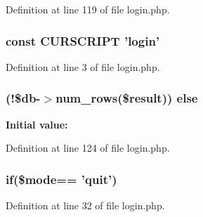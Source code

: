Definition at line 119 of file login.\+php.

\hypertarget{login_8php_a39c39f525eceb86cabc338804f230e80}{
\subsubsection[{C\+U\+R\+S\+C\+R\+I\+P\+T}]{\setlength{\rightskip}{0pt plus 5cm}const C\+U\+R\+S\+C\+R\+I\+P\+T 'login'}}\label{login_8php_a39c39f525eceb86cabc338804f230e80}


Definition at line 3 of file login.\+php.

\hypertarget{login_8php_a4981163641628aa512b27f602580773e}{
\subsubsection[{else}]{ (!\$db-\/$>$num\+\_\+rows(\${\bf result})) else}}\label{login_8php_a4981163641628aa512b27f602580773e}
{\bfseries Initial value\+:}


Definition at line 124 of file login.\+php.

\hypertarget{login_8php_af575261f6cefd08a3eb4b150dbd28744}{
\subsubsection[{if}]{\setlength{\rightskip}{0pt plus 5cm}if(\$mode== 'quit')}}\label{login_8php_af575261f6cefd08a3eb4b150dbd28744}


Definition at line 32 of file login.\+php.

